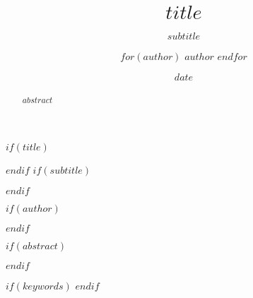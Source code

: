 \documentclass{acm_proc_article-sp}
\begin{document}
$if(title)$
\title{$title$}
$endif$
$if(subtitle)$
\subtitle{$subtitle$}
$endif$

$if(author)$
\author{
  $for(author)$
  \alignauthor $author$
  $endfor$}
$endif$

\date{$date$}


\maketitle
$if(abstract)$
\begin{abstract}
$abstract$
\end{abstract}
$endif$



$if(keywords)$
$endif$



\end{document}
